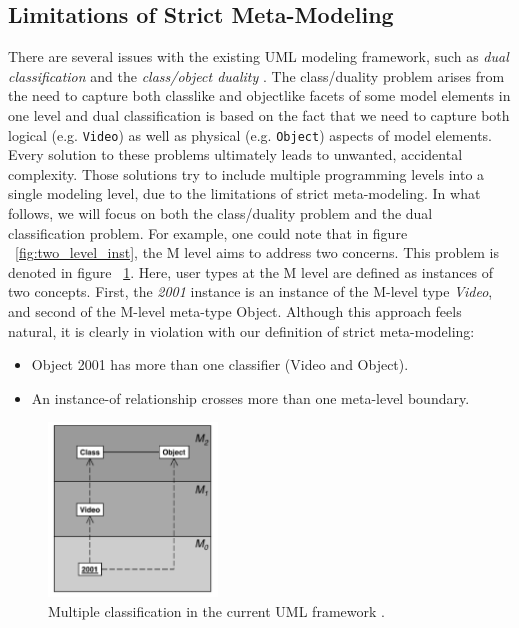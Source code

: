 \subsection{Limitations of Strict Meta-Modeling}

There are several issues with the existing UML modeling framework, such as \textit{dual classification} and the \textit{class/object duality} \cite{RearchitectingUML}. The class/duality problem arises from the need to capture both classlike and objectlike facets of some model elements in one level and dual classification is based on the fact that we need to capture both logical (e.g. \texttt{Video}) as well as physical (e.g. \texttt{Object}) aspects of model elements. Every solution to these problems ultimately leads to unwanted, accidental complexity. Those solutions try to include multiple programming levels into a single modeling level, due to the limitations of strict meta-modeling. In what follows, we will focus on both the class/duality problem and the dual classification problem. For example, one could note that in figure ~\ref{fig:two_level_inst}, the M level aims to address two concerns. This problem is denoted in figure ~\ref{fig:multiple_class_mm}. Here, user types at the M level are defined as instances of two concepts. First, the \textit{2001} instance is an instance of the M-level type \textit{Video}, and second of the M-level meta-type Object. Although this approach feels natural, it is clearly in violation with our definition of strict meta-modeling:

\begin{itemize}
\item{Object 2001 has more than one classifier (Video and Object).}
\item{An instance-of relationship crosses more than one meta-level boundary.}
\end{itemize}

\begin{figure}[h!]
\centering
\includegraphics[width=0.4\textwidth]{images/chap2_multiple_class_uml.png}
\caption{Multiple classification in the current UML framework \cite{RearchitectingUML}.}
\label{fig:multiple_class_mm}
\end{figure}


